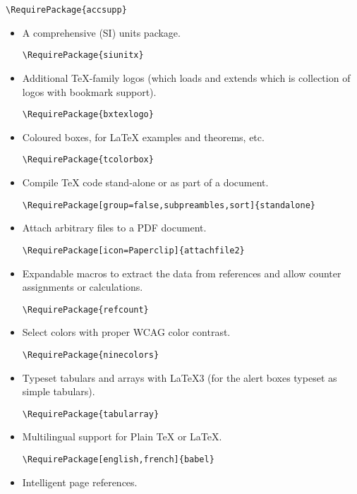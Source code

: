 \documentclass{letgut}
\begin{document}
\begin{lstlisting}
\RequirePackage{accsupp}
\end{lstlisting}
\begin{itemize}
\item A comprehensive (SI) units package.
\begin{lstlisting}
\RequirePackage{siunitx}
\end{lstlisting}
\item Additional \TeX{}-family logos (which loads and extends  which is
collection of logos with bookmark support).
\begin{lstlisting}
\RequirePackage{bxtexlogo}
\end{lstlisting}
\item Coloured boxes, for \LaTeX{} examples and theorems, etc.
\begin{lstlisting}
\RequirePackage{tcolorbox}
\end{lstlisting}
\item Compile \TeX{} code stand-alone or as part of a document.
\begin{lstlisting}
\RequirePackage[group=false,subpreambles,sort]{standalone}
\end{lstlisting}
\item Attach arbitrary files to a PDF document.
\begin{lstlisting}
\RequirePackage[icon=Paperclip]{attachfile2}
\end{lstlisting}
\item Expandable macros to extract the data from references and allow counter
assignments or calculations.
\begin{lstlisting}
\RequirePackage{refcount}
\end{lstlisting}
\item Select colors with proper WCAG color contrast.
\begin{lstlisting}
\RequirePackage{ninecolors}
\end{lstlisting}
\item Typeset tabulars and arrays with LaTeX3 (for the alert boxes typeset as
simple tabulars).
\begin{lstlisting}
\RequirePackage{tabularray}
\end{lstlisting}
\item Multilingual support for Plain \TeX{} or \LaTeX{}.
\begin{lstlisting}
\RequirePackage[english,french]{babel}
\end{lstlisting}
\item Intelligent page references.

\end{itemize}
\end{document}
